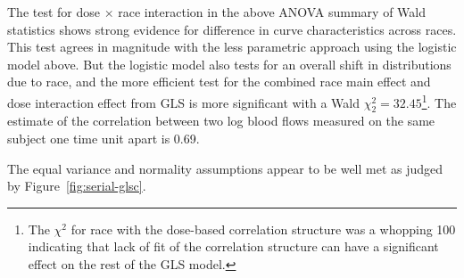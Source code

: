 The test for dose $\times$ race interaction in the above ANOVA summary \ipacue
of Wald statistics shows strong evidence for difference in curve
characteristics across races.  This test agrees in magnitude
with the less parametric approach using the logistic model above.  But
the logistic model also tests for an overall shift in distributions
due to race, and the more efficient test for the combined race main
effect and dose interaction effect from GLS is more significant
with a Wald $\chi^{2}_{2} = 32.45$\footnote{The $\chi^2$ for race with the dose-based correlation structure was a whopping 100 indicating that lack of fit of the correlation structure can have a significant effect on the rest of the GLS model.}. The
estimate of the correlation between two log blood flows measured on
the same subject one time unit apart is 0.69.

The equal variance and normality assumptions appear to be well met as
judged by Figure~\ref{fig:serial-glsc}.

